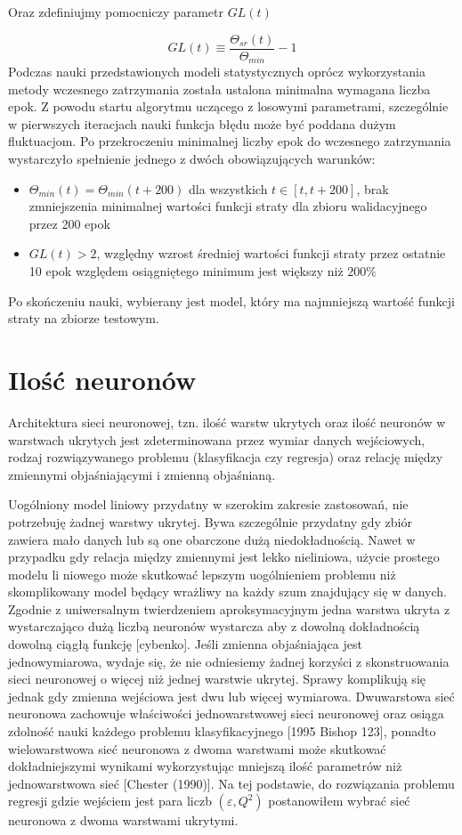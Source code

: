 \documentclass[11pt]{book}
\theoremstyle{definition}
\begin{document}
Oraz zdefiniujmy pomocniczy parametr $GL(t)$


$$
GL(t) \equiv \frac{\Theta_{sr}(t)}{\Theta_{min}} - 1
$$
Podczas nauki przedstawionych modeli statystycznych oprócz wykorzystania metody wczesnego zatrzymania została ustalona minimalna wymagana liczba epok. Z powodu startu algorytmu uczącego z losowymi parametrami, szczególnie w pierwszych iteracjach nauki funkcja błędu może być poddana dużym fluktuacjom. Po przekroczeniu minimalnej liczby epok do wczesnego zatrzymania wystarczyło spełnienie jednego z dwóch obowiązujących warunków:

\begin{itemize}
	\item $\Theta_{min}(t) = \Theta_{min}(t+ 200)$ dla wszystkich $t \in [t,t+200]$, brak zmniejszenia minimalnej wartości funkcji straty dla zbioru walidacyjnego przez 200 epok 
	\item $ GL(t)  > 2$, względny wzrost średniej wartości funkcji straty przez ostatnie 10 epok względem osiągniętego minimum jest większy niż $200\%$
\end{itemize}

Po skończeniu nauki, wybierany jest model, który ma najmniejszą wartość funkcji straty na zbiorze testowym.

\section{Ilość neuronów}

Architektura sieci neuronowej, tzn. ilość warstw ukrytych oraz ilość neuronów w warstwach ukrytych jest zdeterminowana przez wymiar danych wejściowych, rodzaj rozwiązywanego problemu (klasyfikacja czy regresja) oraz relację między zmiennymi objaśniającymi i zmienną objaśnianą.

Uogólniony model liniowy przydatny w szerokim zakresie zastosowań, nie potrzebuję żadnej warstwy ukrytej. Bywa szczególnie przydatny gdy zbiór zawiera mało danych lub są one obarczone dużą niedokładnością. Nawet w przypadku gdy relacja między zmiennymi jest lekko nieliniowa, użycie prostego modelu li	niowego może skutkować lepszym uogólnieniem problemu niż skomplikowany model będący wrażliwy na każdy szum znajdujący się w danych. Zgodnie z uniwersalnym twierdzeniem aproksymacyjnym jedna warstwa ukryta z wystarczająco dużą liczbą neuronów wystarcza aby z dowolną dokładnością dowolną ciągłą funkcję [cybenko]. Jeśli zmienna objaśniająca jest jednowymiarowa, wydaje się, że nie odniesiemy żadnej korzyści z skonstruowania sieci neuronowej o więcej niż jednej warstwie ukrytej. Sprawy komplikują się jednak gdy zmienna wejściowa jest dwu lub więcej wymiarowa. Dwuwarstowa sieć neuronowa zachowuje właściwości jednowarstwowej sieci neuronowej oraz osiąga zdolność nauki każdego problemu klasyfikacyjnego [1995 Bishop 123], ponadto wielowarstwowa sieć neuronowa z dwoma warstwami może skutkować dokładniejszymi wynikami wykorzystując mniejszą ilość parametrów niż jednowarstwowa sieć [Chester (1990)]. Na tej podstawie, do rozwiązania problemu regresji gdzie wejściem jest para liczb $(\varepsilon, Q^2)$ postanowiłem wybrać sieć neuronowa z dwoma warstwami ukrytymi. 
\end{document}
